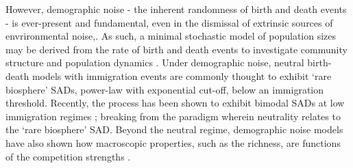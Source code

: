 \documentclass[9pt,twocolumn,twoside,lineno]{pnas-new}
\begin{document}
However, demographic noise - the inherent randomness of birth and death events - is ever-present and fundamental, even in the dismissal of extrinsic sources of envrironmental noise,. %
As such, a minimal stochastic model of population sizes may be derived from the rate of birth and death events to investigate community structure and population dynamics \cite{hubbell2001unified,alonso2006merits,haegeman2011mathematical}. 
%
Under demographic noise, neutral birth-death models with immigration events are commonly thought to exhibit `rare biosphere' SADs, power-law with exponential cut-off, below an immigration threshold. 
Recently, the process has been shown to exhibit bimodal SADs at low immigration regimes \cite{xu2018immigration}; breaking from the paradigm wherein neutrality relates to the `rare biosphere' SAD.
Beyond the neutral regime, demographic noise models have also shown how macroscopic properties, such as the richness, are functions of the competition strengths \cite{haegeman2011mathematical,capitan2015similar,capitan2017stochastic,capitan2020competitive}. %
\end{document}
